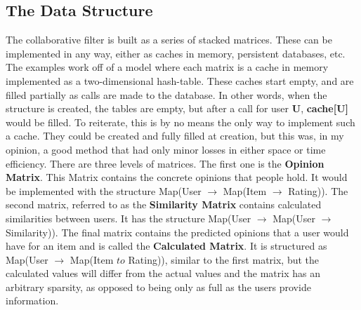 \documentclass[12pt]{article}
\begin{document}
  \subsection{The Data Structure}
  \indent The collaborative filter is built as a series of stacked matrices.  These can be implemented in any way, either as caches in memory, persistent databases, etc.  The examples work off of a model where each matrix is a cache in memory implemented as a two-dimensional hash-table.  These caches start empty, and are filled partially as calls are made to the database.  In other words, when the structure is created, the tables are empty, but after a call for user \textbf{U}, \textbf{cache[U]} would be filled.
  \p To reiterate, this is by no means the only way to implement such a cache.  They could be created and fully filled at creation, but this was, in my opinion, a good method that had only minor losses in either space or time efficiency.
  \p There are three levels of matrices.  The first one is the \textbf{Opinion Matrix}.  This Matrix contains the concrete opinions that people hold.  It would be implemented with the structure Map(User $\to$ Map(Item $\to$ Rating)).  
  \p The second matrix, referred to as the \textbf{Similarity Matrix} contains calculated similarities between users.  It has the structure Map(User $\to$ Map(User $\to$ Similarity)).  
  \p The final matrix contains the predicted opinions that a user would have for an item and is called the \textbf{Calculated Matrix}.  It is structured as Map(User $\to$ Map(Item $to$ Rating)), similar to the first matrix, but the calculated values will differ from the actual values and the matrix has an arbitrary sparsity, as opposed to being only as full as the users provide information.
 
\end{document}

